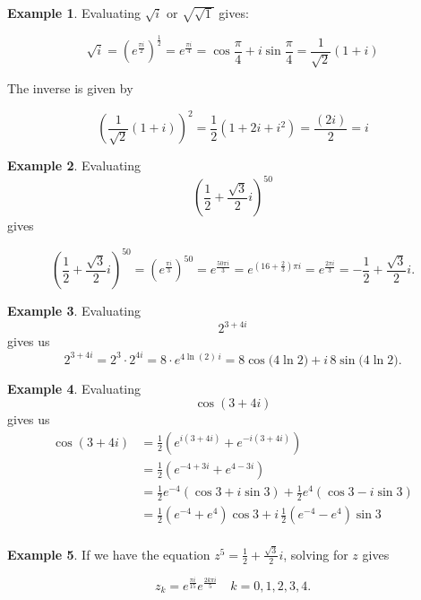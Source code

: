 \documentclass[12pt]{article}
\theoremstyle{definition}
\newtheorem*{example}{Example}
\begin{document}
\begin{example}
    Evaluating $\sqrt{i}$ or $\sqrt{\sqrt{1}}$ gives:

    $$\sqrt{i} = \left(e^{\frac{\pi i}{2}}\right)^{\frac{1}{2}} = e^{\frac{\pi i }{4}} = \cos \frac{\pi}{4} + i \sin \frac{\pi}{4} = \frac{1}{\sqrt{2}} (1 + i)$$

    The inverse is given by

    $$\left(\frac{1}{\sqrt{2}} (1 + i)\right)^2 = \frac{1}{2}(1 + 2i + i^2) = \frac{(2i)}{2} = i$$
\end{example}


\begin{example}
    Evaluating $$ \left(\frac{1}{2}+\frac{\sqrt{3}}{2}i\right)^{50} $$ gives

    $$
    \left(\frac{1}{2}+\frac{\sqrt{3}}{2}i\right)^{50}
    =\left(e^{\frac{\pi i}{3}}\right)^{50}
    =e^{\frac{50\pi i}{3}}
    =e^{\left(16+\frac{2}{3}\right)\pi i}
    =e^{\frac{2\pi i}{3}}
    =-\frac{1}{2}+\frac{\sqrt{3}}{2}i.
    $$
\end{example}


\begin{example}
    Evaluating $$2^{3+4i}$$ gives us
    $$
    2^{3+4i}=2^3\cdot 2^{4i}=8\cdot e^{4\ln(2)\,i}
    =8\cos\!\big(4\ln 2\big)+i\,8\sin\!\big(4\ln 2\big).
    $$

\end{example}

\begin{example}
    Evaluating $$\cos(3+4i)$$
    gives us
    \begin{align*}
        \cos(3+4i) &= \frac{1}{2}\!\left(e^{i(3+4i)}+e^{-i(3+4i)}\right) \\
        &= \frac{1}{2}\!\left(e^{-4+3i}+e^{4-3i}\right) \\
        &= \frac{1}{2}e^{-4}(\cos 3+i\sin 3)+\frac{1}{2}e^{4}(\cos 3-i\sin 3) \\
        &= \frac{1}{2}(e^{-4}+e^{4})\cos 3+i\,\frac{1}{2}(e^{-4}-e^{4})\sin 3 \\     
    \end{align*}

\end{example}

\begin{example}
    If we have the equation $z^5=\frac{1}{2}+\frac{\sqrt{3}}{2}i$, solving for $z$ gives

    $$
    z_k = e^{\frac{\pi i}{15}} e^{\frac{2k\pi i}{5}}
    \quad k=0,1,2,3,4.
    $$
\end{example}
\end{document}
